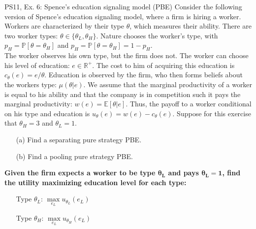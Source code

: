 \begin{frame}{PS11, Ex. 6: Spence’s education signaling model (PBE)}
    Consider the following version of Spence’s education signaling model, where a firm is hiring a worker. Workers are characterized by their type $\theta$, which measures their ability. There are two worker types: $\theta\in\{\theta_L,\theta_H\}$. Nature chooses the worker’s type, with $p_H=\mathbb{P}[\theta=\theta_H]$ and $p_H=\mathbb{P}[\theta=\theta_H]=1-p_H$.\\\vspace{2pt}
    The worker observes his own type, but the firm does not. The worker can choose his level of education: $e\in\mathbb{R}^{+}$. The cost to him of acquiring this education is $c_\theta(e)=e/\theta$. Education is observed by the firm, who then forms beliefs about the workers type: $\mu(\theta|e)$. We assume that the marginal productivity of a worker is equal to his ability and that the company is in competition such it pays the marginal productivity: $w(e)=\mathbb{E}[\theta|e]$. Thus, the payoff to a worker conditional on his type and education is $u_\theta(e)=w(e)-c_\theta(e)$. Suppose for this exercise that $\theta_H=3$ and $\theta_L=1$.\vspace{-6pt}
    \begin{multicols}{2}
      \begin{itemize}
        \item[(a)] Find a separating pure strategy PBE.
        \item[(b)] Find a pooling pure strategy PBE.
      \end{itemize}\vspace{-2pt}
      \textbf{Given the firm expects a worker to be type $\bm{\theta_L}$ and pays $\bm{\theta_L=1}$, find the utility maximizing education level for each type:}\vspace{-4pt}
      \begin{itemize}
        \item[Type $\theta_L$:] $\max\limits_{e_L}u_{\theta_L}(e_L)$\\
        \item[Type $\theta_H$:] $\max\limits_{e_L}u_{\theta_H}(e_L)$
      \end{itemize}
      \vfill\null\columnbreak
      \vfill\null
    \end{multicols}
\end{frame}
